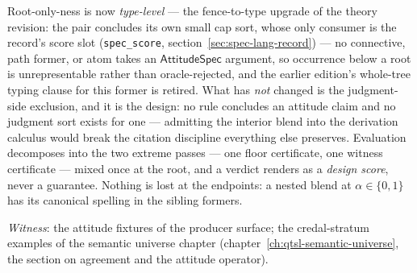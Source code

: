 Root-only-ness is now \emph{type-level} --- the fence-to-type
upgrade of the theory revision: the pair concludes its own small
cap sort, whose only consumer is the record's score slot
(\texttt{spec\_score}, section~\ref{sec:spec-lang-record}) --- no
connective, path former, or atom takes an $\mathsf{AttitudeSpec}$
argument, so occurrence below a root is unrepresentable rather than
oracle-rejected, and the earlier edition's whole-tree typing clause
for this former is retired. What has \emph{not} changed is the
judgment-side exclusion, and it is the design: no rule concludes an
attitude claim and no judgment sort exists for one --- admitting
the interior blend into the derivation calculus would break the
citation discipline everything else preserves. Evaluation
decomposes into the two extreme passes --- one floor certificate,
one witness certificate --- mixed once at the root, and a verdict
renders as a \emph{design score}, never a guarantee. Nothing is
lost at the endpoints: a nested blend at $\alpha \in \{0, 1\}$ has
its canonical spelling in the sibling formers.

\emph{Witness}: the attitude fixtures of the producer surface; the
credal-stratum examples of the semantic universe chapter
(chapter~\ref{ch:qtsl-semantic-universe}, the section on agreement
and the attitude operator).



